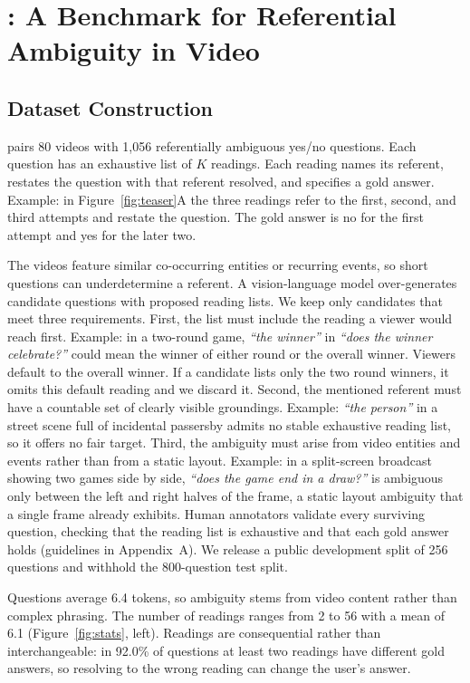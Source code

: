 \section{\bench{}: A Benchmark for Referential Ambiguity in Video}
\label{sec:benchmark}

\subsection{Dataset Construction}
\label{sec:construction}

\bench{} pairs 80 videos with 1{,}056 referentially ambiguous yes/no questions. Each question has an exhaustive list of $K$ readings. Each reading names its referent, restates the question with that referent resolved, and specifies a gold answer. Example: in Figure~\ref{fig:teaser}A the three readings refer to the first, second, and third attempts and restate the question. The gold answer is no for the first attempt and yes for the later two.

The videos feature similar co-occurring entities or recurring events, so short questions can underdetermine a referent. A vision-language model over-generates candidate questions with proposed reading lists. We keep only candidates that meet three requirements. First, the list must include the reading a viewer would reach first. Example: in a two-round game, \textit{``the winner''} in \textit{``does the winner celebrate?''} could mean the winner of either round or the overall winner. Viewers default to the overall winner. If a candidate lists only the two round winners, it omits this default reading and we discard it. Second, the mentioned referent must have a countable set of clearly visible groundings. Example: \textit{``the person''} in a street scene full of incidental passersby admits no stable exhaustive reading list, so it offers no fair target. Third, the ambiguity must arise from video entities and events rather than from a static layout. Example: in a split-screen broadcast showing two games side by side, \textit{``does the game end in a draw?''} is ambiguous only between the left and right halves of the frame, a static layout ambiguity that a single frame already exhibits. Human annotators validate every surviving question, checking that the reading list is exhaustive and that each gold answer holds (guidelines in Appendix~A). We release a public development split of 256 questions and withhold the 800-question test split.

Questions average 6.4 tokens, so ambiguity stems from video content rather than complex phrasing. The number of readings ranges from 2 to 56 with a mean of 6.1 (Figure~\ref{fig:stats}, left). Readings are consequential rather than interchangeable: in 92.0\% of questions at least two readings have different gold answers, so resolving to the wrong reading can change the user's answer.

